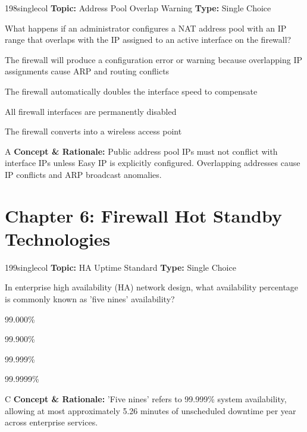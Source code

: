 \begin{qcard}{198}{singlecol}
\textcolor{darkslate!75}{\small\textbf{Topic:} Address Pool Overlap Warning \hfill \textbf{Type:} Single Choice}\vspace{0.4em}\par
What happens if an administrator configures a NAT address pool with an IP range that overlaps with the IP assigned to an active interface on the firewall?
\begin{qoptions}
\item The firewall will produce a configuration error or warning because overlapping IP assignments cause ARP and routing conflicts
\item The firewall automatically doubles the interface speed to compensate
\item All firewall interfaces are permanently disabled
\item The firewall converts into a wireless access point
\end{qoptions}
\end{qcard}
\nopagebreak
\begin{explainbox}{A}
\textbf{Concept \& Rationale:} Public address pool IPs must not conflict with interface IPs unless Easy IP is explicitly configured. Overlapping addresses cause IP conflicts and ARP broadcast anomalies.
\end{explainbox}

\section{Chapter 6: Firewall Hot Standby Technologies}

\begin{qcard}{199}{singlecol}
\textcolor{darkslate!75}{\small\textbf{Topic:} HA Uptime Standard \hfill \textbf{Type:} Single Choice}\vspace{0.4em}\par
In enterprise high availability (HA) network design, what availability percentage is commonly known as 'five nines' availability?
\begin{qoptions}
\item 99.000\%
\item 99.900\%
\item 99.999\%
\item 99.9999\%
\end{qoptions}
\end{qcard}
\nopagebreak
\begin{explainbox}{C}
\textbf{Concept \& Rationale:} 'Five nines' refers to 99.999\% system availability, allowing at most approximately 5.26 minutes of unscheduled downtime per year across enterprise services.
\end{explainbox}

